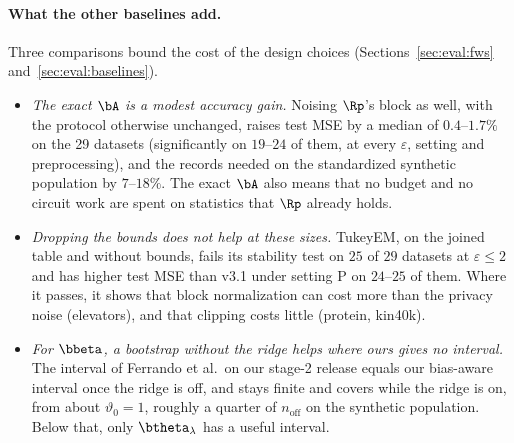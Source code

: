 


\paragraph{What the other baselines add.} Three comparisons bound the cost of the design choices (Sections~\ref{sec:eval:fws} and~\ref{sec:eval:baselines}).
\begin{itemize}[noitemsep]
  \item \emph{The exact $\bA$ is a modest accuracy gain.} Noising $\Rp$'s block as well, with the protocol otherwise unchanged, raises test MSE by a median of $0.4$--$1.7\%$ on the 29 datasets (significantly on $19$--$24$ of them, at every $\varepsilon$, setting and preprocessing), and the records needed on the standardized synthetic population by $7$--$18\%$. The exact $\bA$ also means that no budget and no circuit work are spent on statistics that $\Rp$ already holds.
  \item \emph{Dropping the bounds does not help at these sizes.} TukeyEM, on the joined table and without bounds, fails its stability test on $25$ of $29$ datasets at $\varepsilon \le 2$ and has higher test MSE than v3.1 under setting P on $24$--$25$ of them. Where it passes, it shows that block normalization can cost more than the privacy noise (elevators), and that clipping costs little (protein, kin40k).
  \item \emph{For $\bbeta$, a bootstrap without the ridge helps where ours gives no interval.} The interval of Ferrando et al.\ on our stage-2 release equals our bias-aware interval once the ridge is off, and stays finite and covers while the ridge is on, from about $\vartheta_0 = 1$, roughly a quarter of $n_{\mathrm{off}}$ on the synthetic population. Below that, only $\btheta_\lambda$ has a useful interval.
\end{itemize}

